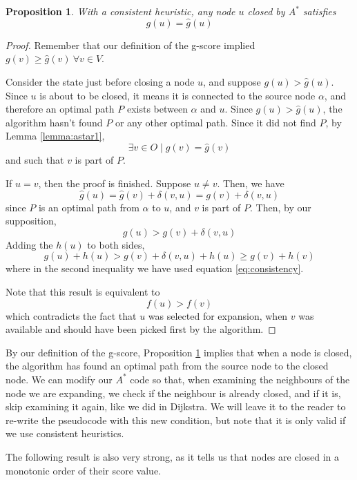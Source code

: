\documentclass[a4paper,10pt]{report}
\newtheorem{proposition}[theorem]{Proposition}
\begin{document}
\begin{proposition}
\label{prop:closed-optimal}
With a consistent heuristic, any node $u$ closed by $A^*$ satisfies
\[ g(u) = \hat{g}(u) \]
\end{proposition}
\begin{proof}
Remember that our definition of the g-score implied $g(v) \geq \hat{g}(v) \ \forall v \in V$.

Consider the state just before closing a node $u$, and suppose $g(u) > \hat{g}(u)$. Since $u$ is about to be closed, it means it is connected to the source node $\alpha$, and therefore an optimal path $P$ exists between $\alpha$ and $u$. Since $g(u) > \hat{g}(u)$, the algorithm hasn't found $P$ or any other optimal path. Since it did not find $P$, by Lemma \ref{lemma:astar1},
\[ \exists v \in O \mid g(v) = \hat{g}(v) \]
and such that $v$ is part of $P$.

If $u = v$, then the proof is finished. Suppose $u \neq v$. Then, we have
\[ \hat{g}(u) = \hat{g}(v) + \delta(v, u) = g(v) + \delta(v, u) \]
since $P$ is an optimal path from $\alpha$ to $u$, and $v$ is part of $P$. Then, by our supposition,
\[ g(u) > g(v) + \delta(v, u) \]
Adding the $h(u)$ to both sides,
\[ g(u) + h(u) > g(v) + \delta(v, u) + h(u) \geq g(v) + h(v) \]
where in the second inequality we have used equation \ref{eq:consistency}.

Note that this result is equivalent to
\[ f(u) > f(v) \]
which contradicts the fact that $u$ was selected for expansion, when $v$ was available and should have been picked first by the algorithm.
\end{proof}

By our definition of the g-score, Proposition \ref{prop:closed-optimal} implies that when a node is closed, the algorithm has found an optimal path from the source node to the closed node. We can modify our $A^*$ code so that, when examining the neighbours of the node we are expanding, we check if the neighbour is already closed, and if it is, skip examining it again, like we did in Dijkstra. We will leave it to the reader to re-write the pseudocode with this new condition, but note that it is only valid if we use consistent heuristics.

The following result is also very strong, as it tells us that nodes are closed in a monotonic order of their score value.
\end{document}

